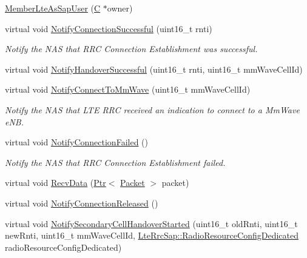\begin{DoxyCompactItemize}
\item 
\hyperlink{classns3_1_1MemberLteAsSapUser_a675c26c2bb21d05f92e674b379a3731b}{Member\+Lte\+As\+Sap\+User} (\hyperlink{loss__COST231__small__cities__urban_8m_aaa53ca0b650dfd85c4f59fa156f7a2cc}{C} $\ast$owner)
\item 
virtual void \hyperlink{classns3_1_1MemberLteAsSapUser_af368218734942b24eba263a3453ae778}{Notify\+Connection\+Successful} (uint16\+\_\+t rnti)
\begin{DoxyCompactList}\small\item\em Notify the N\+AS that R\+RC Connection Establishment was successful. \end{DoxyCompactList}\item 
virtual void \hyperlink{classns3_1_1MemberLteAsSapUser_added4cf9e935bdf78b08fcfa0b0daba4}{Notify\+Handover\+Successful} (uint16\+\_\+t rnti, uint16\+\_\+t mm\+Wave\+Cell\+Id)
\item 
virtual void \hyperlink{classns3_1_1MemberLteAsSapUser_a9836441a14423d3bc506edb4a1664841}{Notify\+Connect\+To\+Mm\+Wave} (uint16\+\_\+t mm\+Wave\+Cell\+Id)
\begin{DoxyCompactList}\small\item\em Notify the N\+AS that L\+TE R\+RC received an indication to connect to a Mm\+Wave e\+NB. \end{DoxyCompactList}\item 
virtual void \hyperlink{classns3_1_1MemberLteAsSapUser_a95db46b7165927d9f3e8fbb77ca4aa3a}{Notify\+Connection\+Failed} ()
\begin{DoxyCompactList}\small\item\em Notify the N\+AS that R\+RC Connection Establishment failed. \end{DoxyCompactList}\item 
virtual void \hyperlink{classns3_1_1MemberLteAsSapUser_ad62ce6b2ea868759c374632747d6b441}{Recv\+Data} (\hyperlink{classns3_1_1Ptr}{Ptr}$<$ \hyperlink{classns3_1_1Packet}{Packet} $>$ packet)
\item 
virtual void \hyperlink{classns3_1_1MemberLteAsSapUser_a6996dbe01bb7bcbcec0506861670935d}{Notify\+Connection\+Released} ()
\item 
virtual void \hyperlink{classns3_1_1MemberLteAsSapUser_a078fa948d0d25575c2b2cf7c3184b34a}{Notify\+Secondary\+Cell\+Handover\+Started} (uint16\+\_\+t old\+Rnti, uint16\+\_\+t new\+Rnti, uint16\+\_\+t mm\+Wave\+Cell\+Id, \hyperlink{structns3_1_1LteRrcSap_1_1RadioResourceConfigDedicated}{Lte\+Rrc\+Sap\+::\+Radio\+Resource\+Config\+Dedicated} radio\+Resource\+Config\+Dedicated)
\end{DoxyCompactItemize}
